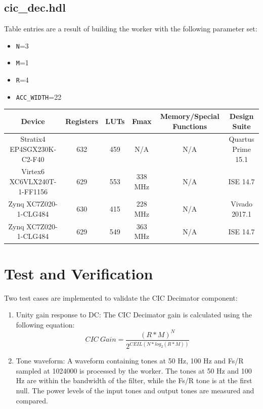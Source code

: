 \documentclass{article}
\def\comp{cic\_dec}
\begin{document}
\subsection*{\comp.hdl}
Table entries are a result of building the worker with the following parameter set:
\begin{itemize}
	\item \verb+N+=3
	\item \verb+M+=1
	\item \verb+R+=4
	\item \verb+ACC_WIDTH+=22
\end{itemize}

\begin{scriptsize}
	\begin{tabular}{|c|c|c|c|c|c|}
		\hline
		\rowcolor{blue}
		Device                      & Registers & LUTs & Fmax    & Memory/Special Functions & Design Suite    \\
		\hline
		Stratix4 EP4SGX230K-C2-F40  & 632       & 459  & N/A       & N/A                      & Quartus Prime 15.1 \\
		\hline
		Virtex6 XC6VLX240T-1-FF1156 & 629       & 553  & 338 MHz & N/A                      & ISE 14.7        \\
		\hline
		Zynq XC7Z020-1-CLG484       & 630       & 415  & 228 MHz & N/A                      & Vivado 2017.1       \\
		\hline
		Zynq XC7Z020-1-CLG484       & 629       & 549  & 363 MHz & N/A                      & ISE 14.7        \\
		\hline
	\end{tabular}
\end{scriptsize}
\newpage
\section*{Test and Verification}
Two test cases are implemented to validate the CIC Decimator component:

\begin{enumerate}
	\item Unity gain response to DC: The CIC Decimator gain is calculated using the following equation:
	      \begin{equation} \label{eq:cic_gain}
	      	CIC\ Gain = \frac{(R*M)^N}{2^{CEIL(N*log_2(R*M))}}
	      \end{equation}
	\item Tone waveform: A waveform containing tones at 50 Hz, 100 Hz and Fs/R sampled at 1024000 is processed by the worker. The tones at 50 Hz and 100 Hz are within the bandwidth of the filter, while the Fs/R tone is at the first null. The power levels of the input tones and output tones are measured and compared.
\end{enumerate}\medskip
\end{document}
